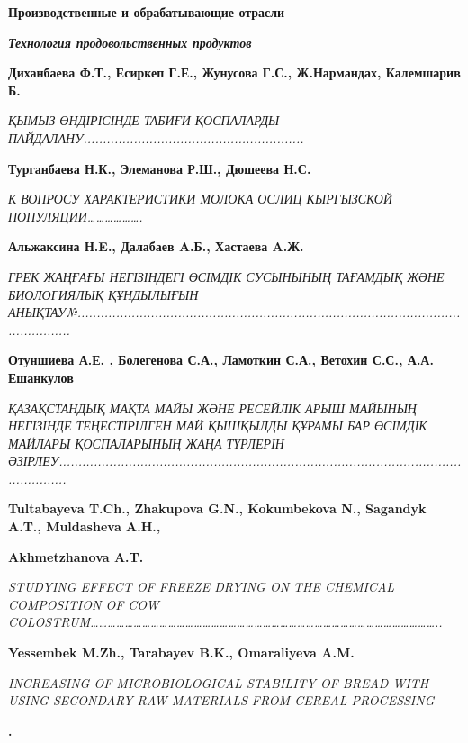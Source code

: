 {\bfseries Производственные и обрабатывающие отрасли}

{\bfseries \emph{Технология продовольственных продуктов}}

{\bfseries Диханбаева Ф.Т., Есиркеп Г.Е., Жунусова Г.С., Ж.Нармандах,
Калемшарив Б.}

\emph{ҚЫМЫЗ ӨНДІРІСІНДЕ ТАБИҒИ ҚОСПАЛАРДЫ
ПАЙДАЛАНУ.........................................................}

{\bfseries Турганбаева Н.К., Элеманова Р.Ш., Дюшеева Н.С.}

\emph{К ВОПРОСУ ХАРАКТЕРИСТИКИ МОЛОКА ОСЛИЦ КЫРГЫЗСКОЙ
ПОПУЛЯЦИИ\ldots\ldots\ldots\ldots\ldots\ldots.}

{\bfseries Альжаксина Н.E., Далабаев A.Б., Хастаева A.Ж.}

\emph{ГРЕК ЖАҢҒАҒЫ НЕГІЗІНДЕГІ ӨСІМДІК СУСЫНЫНЫҢ ТАҒАМДЫҚ ЖӘНЕ
БИОЛОГИЯЛЫҚ ҚҰНДЫЛЫҒЫН
АНЫҚТАУ№...................................................................................................................}

{\bfseries Отуншиева А.Е. , Болегенова С.А., Ламоткин С.А., Ветохин С.С.,
А.А. Ешанкулов}

\emph{ҚАЗАҚСТАНДЫҚ МАҚТА МАЙЫ ЖӘНЕ РЕСЕЙЛІК АРЫШ МАЙЫНЫҢ НЕГІЗІНДЕ
ТЕҢЕСТІРІЛГЕН МАЙ ҚЫШҚЫЛДЫ ҚҰРАМЫ БАР ӨСІМДІК МАЙЛАРЫ ҚОСПАЛАРЫНЫҢ ЖАҢА
ТҮРЛЕРІН
ӘЗІРЛЕУ.......................................................................................................................}

{\bfseries Tultabayeva T.Ch., Zhakupova G.N., Kokumbekova N., Sagandyk
A.T., Muldasheva A.H.,}

{\bfseries Akhmetzhanova A.T.}

\emph{STUDYING EFFECT OF FREEZE DRYING ON THE CHEMICAL COMPOSITION OF
COW
COLOSTRUM\ldots\ldots\ldots\ldots\ldots\ldots\ldots\ldots\ldots\ldots\ldots\ldots\ldots\ldots\ldots\ldots\ldots\ldots\ldots\ldots\ldots\ldots\ldots\ldots\ldots\ldots\ldots\ldots\ldots\ldots\ldots\ldots\ldots\ldots\ldots\ldots\ldots\ldots\ldots\ldots..}

{\bfseries Yessembek M.Zh., Tarabayev B.K., Omaraliyeva A.M.}

\emph{INCREASING OF MICROBIOLOGICAL STABILITY OF BREAD WITH USING
SECONDARY RAW MATERIALS FROM CEREAL PROCESSING}

{\bfseries .}

